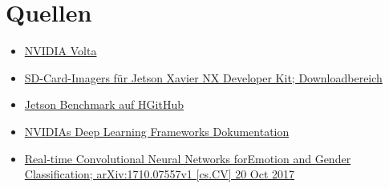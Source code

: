 \section{Quellen}

\begin{itemize}
	\item \href{https://www.nvidia.com/de-de/data-center/volta-gpu-architecture/}{NVIDIA Volta}
	\item \href{https://developer.nvidia.com/jetson-nx-developer-kit-sd-card-image}{SD-Card-Imagers für Jetson Xavier NX Developer Kit; Downloadbereich}
	\item \href{https://github.com/NVIDIA-AI-IOT/jetson_benchmarks}{Jetson Benchmark auf HGitHub}
	\item \href{https://docs.nvidia.com/deeplearning/frameworks/install-tf-jetson-platform/index.html}{NVIDIAs Deep Learning Frameworks Dokumentation}
	\item \href{../../ExterneDDokumente/CNN/1710.07557.pdf}{Real-time Convolutional Neural Networks forEmotion and Gender Classification; arXiv:1710.07557v1 [cs.CV] 20 Oct 2017}
\end{itemize}	
